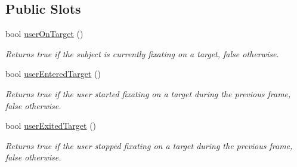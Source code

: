 \subsection*{Public Slots}
\begin{DoxyCompactItemize}
\item 
\hypertarget{class_picto_1_1_choice_controller_a01f58afc4505925fe53d9b68c7163971}{bool \hyperlink{class_picto_1_1_choice_controller_a01f58afc4505925fe53d9b68c7163971}{user\-On\-Target} ()}\label{class_picto_1_1_choice_controller_a01f58afc4505925fe53d9b68c7163971}

\begin{DoxyCompactList}\small\item\em Returns true if the subject is currently fixating on a target, false otherwise. \end{DoxyCompactList}\item 
\hypertarget{class_picto_1_1_choice_controller_a9595f8beac810f04fc4aa5f5e13ba0cc}{bool \hyperlink{class_picto_1_1_choice_controller_a9595f8beac810f04fc4aa5f5e13ba0cc}{user\-Entered\-Target} ()}\label{class_picto_1_1_choice_controller_a9595f8beac810f04fc4aa5f5e13ba0cc}

\begin{DoxyCompactList}\small\item\em Returns true if the user started fixating on a target during the previous frame, false otherwise. \end{DoxyCompactList}\item 
\hypertarget{class_picto_1_1_choice_controller_acdb1ec58ce83a8ddef36341e063a48a9}{bool \hyperlink{class_picto_1_1_choice_controller_acdb1ec58ce83a8ddef36341e063a48a9}{user\-Exited\-Target} ()}\label{class_picto_1_1_choice_controller_acdb1ec58ce83a8ddef36341e063a48a9}

\begin{DoxyCompactList}\small\item\em Returns true if the user stopped fixating on a target during the previous frame, false otherwise. \end{DoxyCompactList}\end{DoxyCompactItemize}

